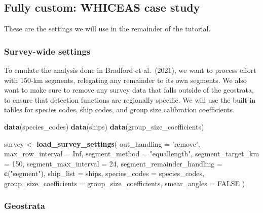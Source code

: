 \documentclass[
]{book}
\newenvironment{Shaded}{\begin{snugshade}}{\end{snugshade}}
\newcommand{\DataTypeTok}[1]{\textcolor[rgb]{0.13,0.29,0.53}{#1}}
\newcommand{\DecValTok}[1]{\textcolor[rgb]{0.00,0.00,0.81}{#1}}
\newcommand{\KeywordTok}[1]{\textcolor[rgb]{0.13,0.29,0.53}{\textbf{#1}}}
\newcommand{\NormalTok}[1]{#1}
\newcommand{\OtherTok}[1]{\textcolor[rgb]{0.56,0.35,0.01}{#1}}
\newcommand{\StringTok}[1]{\textcolor[rgb]{0.31,0.60,0.02}{#1}}
\begin{document}
\hypertarget{fully-custom-whiceas-case-study}{%
\subsection*{Fully custom: WHICEAS case study}\label{fully-custom-whiceas-case-study}}

These are the settings we will use in the remainder of the tutorial.

\hypertarget{survey-wide-settings-1}{%
\subsubsection*{Survey-wide settings}\label{survey-wide-settings-1}}

To emulate the analysis done in Bradford et al.~(2021), we want to process effort with 150-km segments, relegating any remainder to its own segments. We also want to make sure to remove any survey data that falls outside of the geostrata, to ensure that detection functions are regionally specific. We will use the built-in tables for species codes, ship codes, and group size calibration coefficients.

\begin{Shaded}
\begin{Highlighting}[]
\KeywordTok{data}\NormalTok{(species_codes)}
\KeywordTok{data}\NormalTok{(ships)}
\KeywordTok{data}\NormalTok{(group_size_coefficients)}

\NormalTok{survey <-}\StringTok{ }\KeywordTok{load_survey_settings}\NormalTok{(}
  \DataTypeTok{out_handling =} \StringTok{'remove'}\NormalTok{,}
  \DataTypeTok{max_row_interval =} \OtherTok{Inf}\NormalTok{,}
  \DataTypeTok{segment_method =} \StringTok{"equallength"}\NormalTok{,}
  \DataTypeTok{segment_target_km =} \DecValTok{150}\NormalTok{,}
  \DataTypeTok{segment_max_interval =} \DecValTok{24}\NormalTok{,}
  \DataTypeTok{segment_remainder_handling =} \KeywordTok{c}\NormalTok{(}\StringTok{"segment"}\NormalTok{),}
  \DataTypeTok{ship_list =}\NormalTok{ ships,}
  \DataTypeTok{species_codes =}\NormalTok{ species_codes,}
  \DataTypeTok{group_size_coefficients =}\NormalTok{ group_size_coefficients,}
  \DataTypeTok{smear_angles =} \OtherTok{FALSE}
\NormalTok{)}
\end{Highlighting}
\end{Shaded}

\hypertarget{geostrata}{%
\subsubsection*{Geostrata}\label{geostrata}}
\end{document}
